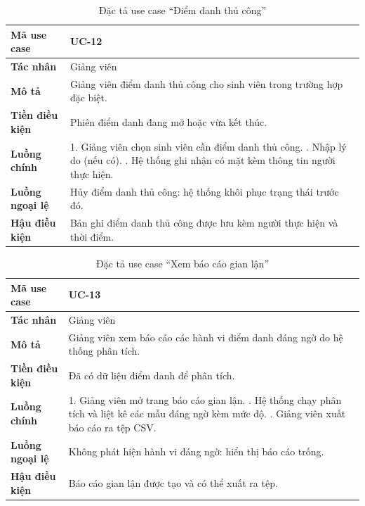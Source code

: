 \begin{table}[H]
\centering
\small
\caption{Đặc tả use case ``Điểm danh thủ công''}
\label{tab:uc-manual}
\begin{tabular}{|p{3cm}|p{10.6cm}|}
\hline
\textbf{Mã use case} & UC-12 \\ \hline
\textbf{Tác nhân} & Giảng viên \\ \hline
\textbf{Mô tả} & Giảng viên điểm danh thủ công cho sinh viên trong trường hợp đặc biệt. \\ \hline
\textbf{Tiền điều kiện} & Phiên điểm danh đang mở hoặc vừa kết thúc. \\ \hline
\textbf{Luồng chính} & 1. Giảng viên chọn sinh viên cần điểm danh thủ công. \newline 2. Nhập lý do (nếu có). \newline 3. Hệ thống ghi nhận có mặt kèm thông tin người thực hiện. \\ \hline
\textbf{Luồng ngoại lệ} & Hủy điểm danh thủ công: hệ thống khôi phục trạng thái trước đó. \\ \hline
\textbf{Hậu điều kiện} & Bản ghi điểm danh thủ công được lưu kèm người thực hiện và thời điểm. \\ \hline
\end{tabular}
\end{table}

\begin{table}[H]
\centering
\small
\caption{Đặc tả use case ``Xem báo cáo gian lận''}
\label{tab:uc-fraud}
\begin{tabular}{|p{3cm}|p{10.6cm}|}
\hline
\textbf{Mã use case} & UC-13 \\ \hline
\textbf{Tác nhân} & Giảng viên \\ \hline
\textbf{Mô tả} & Giảng viên xem báo cáo các hành vi điểm danh đáng ngờ do hệ thống phân tích. \\ \hline
\textbf{Tiền điều kiện} & Đã có dữ liệu điểm danh để phân tích. \\ \hline
\textbf{Luồng chính} & 1. Giảng viên mở trang báo cáo gian lận. \newline 2. Hệ thống chạy phân tích và liệt kê các mẫu đáng ngờ kèm mức độ. \newline 3. Giảng viên xuất báo cáo ra tệp CSV. \\ \hline
\textbf{Luồng ngoại lệ} & Không phát hiện hành vi đáng ngờ: hiển thị báo cáo trống. \\ \hline
\textbf{Hậu điều kiện} & Báo cáo gian lận được tạo và có thể xuất ra tệp. \\ \hline
\end{tabular}
\end{table}

